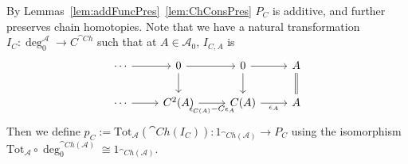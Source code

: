 By Lemmas~\ref{lem:addFuncPres}~\ref{lem:ChConsPres} $P_C$ is additive, and further preserves chain homotopies. Note that we have a natural transformation $I_C:\deg_0^\mathcal{A}\to C^{\cat{Ch}}$ such that at $A \in \mathcal{A}_0$, $I_{C,A}$ is 
\[\begin{tikzcd}
	\cdots & 0 & 0 & A \\
	\cdots & {C^2(A)} & {C(A)} & A
	\arrow[from=1-2, to=1-3]
	\arrow[from=1-3, to=1-4]
	\arrow[from=1-1, to=1-2]
	\arrow[Rightarrow, no head, from=1-4, to=2-4]
	\arrow["{\epsilon_A}"', from=2-3, to=2-4]
	\arrow[from=1-3, to=2-3]
	\arrow[from=1-2, to=2-2]
	\arrow[from=2-1, to=2-2]
	\arrow["{\epsilon_{C(A)}-C\epsilon_A}"', from=2-2, to=2-3]
\end{tikzcd}\]
Then we define $p_{C}:= \text{Tot}_\mathcal{A}(\cat{Ch}(I_C)):1_{\cat{Ch}(\mathcal{A})}\to P_C$ using the isomorphism $\text{Tot}_\mathcal{A}\circ \deg_0^{\cat{Ch}(\mathcal{A})}\cong 1_{\cat{Ch}(\mathcal{A})}$. 


